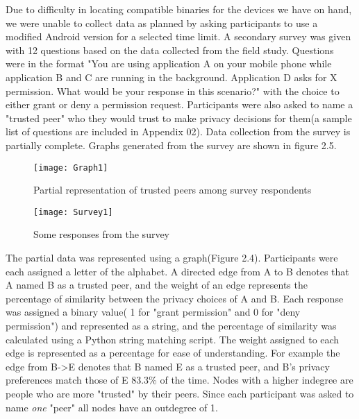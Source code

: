 Due to difficulty in locating compatible binaries for the devices we have on hand, we were unable to collect data as planned by asking participants to use a modified Android version for a selected time limit. A secondary survey was given with 12 questions based on the data collected from the field study\cite{wijesekera2015android}. Questions were in the format "You are using application A on your mobile phone while application B and C are running in the background. Application D asks for X permission. What would be your response in this scenario?" with the choice to either grant or deny a permission request. Participants were also asked to name a "trusted peer" who they would trust to make privacy decisions for them(a sample list of questions are included in Appendix 02). Data collection from the survey is partially complete. Graphs generated from the survey are shown in figure 2.5.
\begin{figure}
\texttt{[image: Graph1]}
\caption{Partial representation of trusted peers among survey respondents}
\end{figure}
\smallskip
\begin{figure}
\texttt{[image: Survey1]}
\caption{Some responses from the survey}
\end{figure}

The partial data was represented using a graph(Figure 2.4). Participants were each assigned a letter of the alphabet. A directed edge from A to B denotes that A named B as a trusted peer, and the weight of an edge represents the percentage of similarity between the privacy choices of A and B. Each response was assigned a binary value( 1 for "grant permission" and 0 for "deny permission") and represented as a string, and the percentage of similarity was calculated using a Python string matching script. The weight assigned to each edge is represented as a percentage for ease of understanding. For example the edge from B->E denotes that B named E as a trusted peer, and B's privacy preferences match those of E 83.3\% of the time. Nodes with a higher indegree are people who are more "trusted" by their peers. Since each participant was asked to name \textit{one} "peer" all nodes have an outdegree of 1. 
\smallskip

